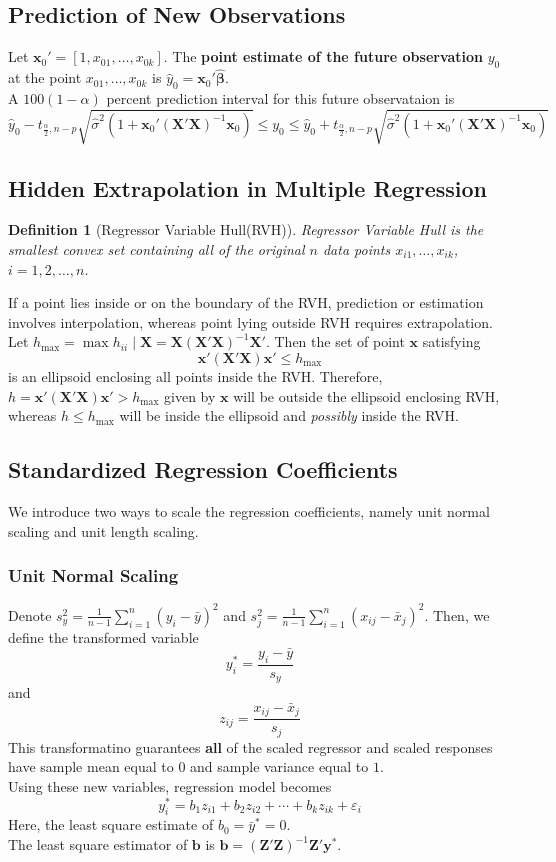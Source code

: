 \documentclass[11pt]{article}
\newtheorem{definition}{Definition}[section]
\theoremstyle{definition}
\begin{document}
\subsection{Prediction of New Observations}
Let $\bm{x}_0'=[1,x_{01},\ldots, x_{0k}]$. The \textbf{point estimate of the future observation} $y_0$ at the point $x_{01},\ldots, x_{0k}$ is $\hat{y}_0=\bm{x}_0'\hat{\bm{\beta}}$.\\
A $100(1-\alpha)$ percent prediction interval for this future observataion is
\[
\hat{y}_0-t_{\frac{\alpha}{2},n-p}\sqrt{\hat{\sigma}^2(1+\bm{x}_0'(\bm{X}'\bm{X})^{-1}\bm{x}_0)}\leq y_0\leq \hat{y}_0+t_{\frac{\alpha}{2},n-p}\sqrt{\hat{\sigma}^2(1+\bm{x}_0'(\bm{X}'\bm{X})^{-1}\bm{x}_0)}
\]
\subsection{Hidden Extrapolation in Multiple Regression}
\begin{definition}[Regressor Variable Hull(RVH)]
\normalfont Regressor Variable Hull is the smallest convex set containing all of the original $n$ data points $x_{i1},\ldots, x_{ik}$, $i=1,2,\ldots, n$.
\end{definition}
If a point lies inside or on the boundary of the RVH, prediction or estimation involves interpolation, whereas point lying outside RVH requires extrapolation.\\
Let $h_{\max} = \max{h_{ii}\mid \bm{X}=\bm{X}(\bm{X}'\bm{X})^{-1}\bm{X}'}$. Then the set of point $\bm{x}$ satisfying
\[
\bm{x}'(\bm{X}'\bm{X})\bm{x}'\leq h_{\max}
\]
is an ellipsoid enclosing all points inside the RVH.
Therefore, $h=\bm{x}'(\bm{X}'\bm{X})\bm{x}'>h_{\max}$ given by $\bm{x}$ will be outside the ellipsoid enclosing RVH, whereas $h\leq h_{\max}$ will be inside the ellipsoid and \textit{possibly} inside the RVH.
\subsection{Standardized Regression Coefficients}
We introduce two ways to scale the regression coefficients, namely unit normal scaling and unit length scaling.
\subsubsection{Unit Normal Scaling}
Denote $s_y^2=\frac{1}{n-1}\sum_{i=1}^n (y_i-\bar{y})^2$ and $s_j^2=\frac{1}{n-1}\sum_{i=1}^n (x_{ij}-\bar{x}_j)^2$. Then, we define the transformed variable
\[
y_i^\ast = \frac{y_i-\bar{y}}{s_y}
\]
and
\[
z_{ij}=\frac{x_{ij}-\bar{x}_j}{s_j}
\]
This transformatino guarantees \textbf{all} of the scaled regressor and scaled responses have sample mean equal to $0$ and sample variance equal to $1$.\\
Using these new variables, regression model becomes
\[
y_i^\ast = b_1z_{i1}+b_2z_{i2}+\cdots+b_kz_{ik}+\varepsilon_i
\]
Here, the least square estimate of $b_0 = \bar{y}^\ast = 0$.\\
The least square estimator of $\bm{b}$ is $\hat{\bm{b}}=(\bm{Z}'\bm{Z})^{-1}\bm{Z}'\bm{y}^\ast$.
\end{document}
